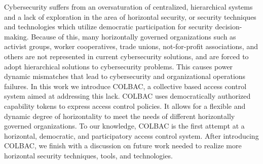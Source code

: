 Cybersecurity suffers from an oversaturation of centralized, hierarchical
systems and a lack of exploration in the area of horizontal security, or
security techniques and technologies which utilize democratic participation for
security decision-making. Because of this, many horizontally governed
organizations such as activist groups, worker cooperatives, trade unions, not-for-profit associations, and others are not represented in current cybersecurity solutions, and are
forced to adopt hierarchical solutions to cybersecurity problems. This causes
power dynamic mismatches that lead to cybersecurity and organizational
operations failures. In this work we introduce COLBAC, a collective based access
control system aimed at addressing this lack. COLBAC uses democratically
authorized capability tokens to express access control policies. It allows for
a flexible and dynamic degree of horizontality to meet the needs of different
horizontally governed organizations. To our knowledge, COLBAC is the first
attempt at a horizontal, democratic, and participatory access control system.
After introducing COLBAC, we finish with a discussion on future work needed to
realize more horizontal security techniques, tools, and technologies.
